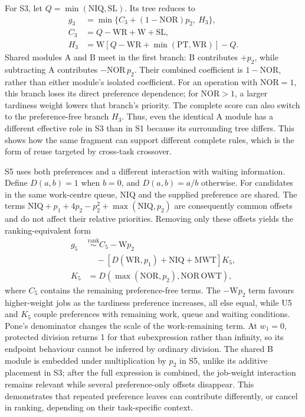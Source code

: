 For S3, let $Q=\min(\mathrm{NIQ},\mathrm{SL})$. Its tree reduces to
\begin{equation}
\begin{aligned}
g_3&=\min\{C_3+(1-\mathrm{NOR})p_2,\ H_3\},\\
C_3&=Q-\mathrm{WR}+\mathrm{W}+\mathrm{SL},\\
H_3&=\mathrm{W}[Q-\mathrm{WR}+\min(\mathrm{PT},\mathrm{WR})]-Q.
\end{aligned}
\label{eq:case-tree-s3}
\end{equation}
Shared modules A and B meet in the first branch: B contributes $+p_2$, while subtracting A contributes $-\mathrm{NOR}\,p_2$. Their combined coefficient is $1-\mathrm{NOR}$, rather than either module's isolated coefficient. For an operation with $\mathrm{NOR}=1$, this branch loses its direct preference dependence; for $\mathrm{NOR}>1$, a larger tardiness weight lowers that branch's priority. The complete score can also switch to the preference-free branch $H_3$. Thus, even the identical A module has a different effective role in S3 than in S1 because its surrounding tree differs. This shows how the same fragment can support different complete rules, which is the form of reuse targeted by cross-task crossover.

S5 uses both preferences and a different interaction with waiting information. Define $D(a,b)=1$ when $b=0$, and $D(a,b)=a/b$ otherwise. For candidates in the same work-centre queue, NIQ and the supplied preference are shared. The terms $\mathrm{NIQ}+p_1+4p_2-p_2^2+\max(\mathrm{NIQ},p_2)$ are consequently common offsets and do not affect their relative priorities. Removing only these offsets yields the ranking-equivalent form
\begin{equation}
\begin{aligned}
g_5&\overset{\mathrm{rank}}{\sim}
C_5-\mathrm{W}p_2\\
&\quad-[D(\mathrm{WR},p_1)+\mathrm{NIQ}+\mathrm{MWT}]K_5,\\
K_5&=D\!\left(\max(\mathrm{NOR},p_2),\mathrm{NOR}\,\mathrm{OWT}\right),
\end{aligned}
\label{eq:case-tree-s5}
\end{equation}
where $C_5$ contains the remaining preference-free terms. The $-\mathrm{W}p_2$ term favours higher-weight jobs as the tardiness preference increases, all else equal, while U5 and $K_5$ couple preferences with remaining work, queue and waiting conditions. Pone's denominator changes the scale of the work-remaining term. At $w_1=0$, protected division returns 1 for that subexpression rather than infinity, so its endpoint behaviour cannot be inferred by ordinary division. The shared B module is embedded under multiplication by $p_2$ in S5, unlike its additive placement in S3; after the full expression is combined, the job-weight interaction remains relevant while several preference-only offsets disappear. This demonstrates that repeated preference leaves can contribute differently, or cancel in ranking, depending on their task-specific context.

